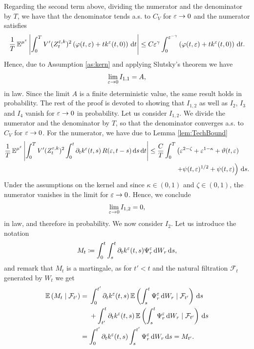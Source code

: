 \documentclass[10pt]{article}
\begin{document}
Regarding the second term above, dividing the numerator and the denominator by $T$, we have that the denominator tends a.s. to $C_V$ for $\varepsilon \to 0$ and the numerator satisfies
\begin{equation}
	\frac1T \operatorname{\mathbb{E}}^{\mu^\varepsilon} \left\lvert\int_0^T V'(Z^{\varepsilon,k}_t)^2 \left(\varphi(t, \varepsilon) + t k^\varepsilon(t, 0) \right) \,\mathrm{d} t\right\rvert \leq C \varepsilon^{\gamma} \int_0^{\varepsilon^{-\gamma}} \left(\varphi(t, \varepsilon) + t k^\varepsilon(t, 0)\right) \,\mathrm{d} t.
\end{equation}
Hence, due to Assumption \ref{as:kern} and applying Slutsky's theorem we have
\begin{equation}
	\lim_{\varepsilon \to 0} I_{1,1} = A, 
\end{equation}
in law. Since the limit $A$ is a finite deterministic value, the same result holds in probability. The rest of the proof is devoted to showing that $I_{1,2}$ as well as $I_2$, $I_3$ and $I_4$ vanish for $\varepsilon \to 0$ in probability. Let us consider $I_{1,2}$. We divide the numerator and the denominator by $T$, so that the denominator converges a.s. to $C_V$ for $\varepsilon \to 0$. For the numerator, we have due to Lemma \ref{lem:TechBound} 
\begin{equation}
\begin{aligned}
	\frac1T \operatorname{\mathbb{E}}^{\mu^\varepsilon} \left\lvert\int_0^T V'(Z^{\varepsilon,k}_t)^2 \int_0^t \partial_t k^\varepsilon(t, s) \, R(\varepsilon, t-s) \,\mathrm{d} s \,\mathrm{d} t \right\rvert \leq 
	\frac{C}{T} \int_0^T &\left(\varepsilon^{2-\zeta} + \varepsilon^{1-\kappa} + \vartheta(t, \varepsilon) \right.\\
						 &\left.+ \psi(t, \varepsilon)^{1/2} + \psi(t, \varepsilon) \right) \,\mathrm{d} s.
\end{aligned}
\end{equation}
Under the assumptions on the kernel and since $\kappa \in (0, 1)$ and $\zeta \in (0, 1)$, the numerator vanishes in the limit for $\varepsilon \to 0$. Hence, we conclude
\begin{equation}
	\lim_{\varepsilon \to 0} I_{1, 2} = 0,
\end{equation}
in law, and therefore in probability. We now consider $I_2$. Let us introduce the notation
\begin{equation}
	M_t \coloneqq \int_0^t \int_s^t \partial_t k^\varepsilon(t, s)\Psi^\varepsilon_r \,\mathrm{d} W_r \,\mathrm{d} s,
\end{equation}
and remark that $M_t$ is a martingale, as for $t' < t$ and the natural filtration $\mathcal F_t$ generated by $W_t$ we get
\begin{equation}
\begin{aligned}
\operatorname{\mathbb{E}}\left(M_t \mid \mathcal F_{t'}\right) &= 
\begin{aligned}[t]
&\int_0^{t'}  \partial_t k^\varepsilon(t, s) \operatorname{\mathbb{E}} \left( \int_s^t \Psi^\varepsilon_r \,\mathrm{d} W_r \mid \mathcal F_{t'}\right) \,\mathrm{d} s \\
&+ \int_{t'}^{t} \partial_t k^\varepsilon(t, s) \operatorname{\mathbb{E}} \left( \int_s^t \Psi^\varepsilon_r \,\mathrm{d} W_r \mid \mathcal F_{t'}\right) \,\mathrm{d} s
\end{aligned}
\\
&= \int_0^{t'} \partial_t k^\varepsilon(t, s) \int_s^{t'} \Psi^\varepsilon_r \,\mathrm{d} W_r \,\mathrm{d} s = M_{t'}.
\end{aligned}
\end{equation}
\end{document}
